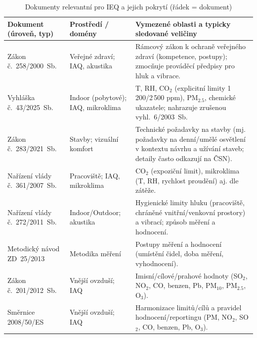 \begin{table}[p]

\begin{center}
\setlength{\tabcolsep}{3pt}
\renewcommand{\arraystretch}{1.05}
\scriptsize
\caption{Dokumenty relevantní pro IEQ a jejich pokrytí (řádek = dokument)}\label{tab:legislativa_ieq_dokumenty}
\begin{tabularx}{\textwidth}{@{}
>{\raggedright\arraybackslash}p{}
  >{\raggedright\arraybackslash}p{}
  X@{}}
\toprule
\textbf{Dokument (úroveň, typ)} & \textbf{Prostředí / domény} & \textbf{Vymezené oblasti a typicky sledované veličiny} \\
\midrule

Zákon č.~258/2000~Sb. &
Veřejné zdraví; IAQ, akustika &
Rámcový zákon k ochraně veřejného zdraví (kompetence, postupy); zmocňuje prováděcí předpisy pro hluk a vibrace. \\
Vyhláška č.~43/2025~Sb. &
Indoor (pobytové); IAQ, mikroklima &
T, RH, CO$_2$ (explicitní limity 1\,200/2\,500 ppm), PM$_{2.5}$, chemické ukazatele; nahrazuje zrušenou vyhl.~6/2003~Sb. \\

Zákon č.~283/2021~Sb. &
Stavby; vizuální komfort &
Technické požadavky na stavby (mj. požadavky na denní/umělé osvětlení v kontextu návrhu a užívání staveb; detaily často odkazují na ČSN). \\

Nařízení vlády č.~361/2007~Sb. &
Pracoviště; IAQ, mikroklima &
CO$_2$ (expoziční limit), mikroklima (T, RH, rychlost proudění) aj. dle zátěže. \\

Nařízení vlády č.~272/2011~Sb. &
Indoor/Outdoor; akustika &
Hygienické limity hluku (pracoviště, chráněné vnitřní/venkovní prostory) a vibrací; způsob měření a hodnocení. \\

Metodický návod ZD~25/2013 &
Metodika měření &
Postupy měření a hodnocení (umístění čidel, doba měření, vyhodnocení). \\

Zákon č.~201/2012~Sb. &
Vnější ovzduší; IAQ &
Imisní/cílové/prahové hodnoty (SO$_2$, NO$_2$, CO, benzen, Pb, PM$_{10}$, PM$_{2.5}$, O$_3$). \\

\midrule
Směrnice 2008/50/ES &
Vnější ovzduší; IAQ &
Harmonizace limitů/cílů a pravidel hodnocení/reportingu (PM, NO$_2$, SO$_2$, CO, benzen, Pb, O$_3$). \\


\end{tabularx}
\end{center}
\end{table}
